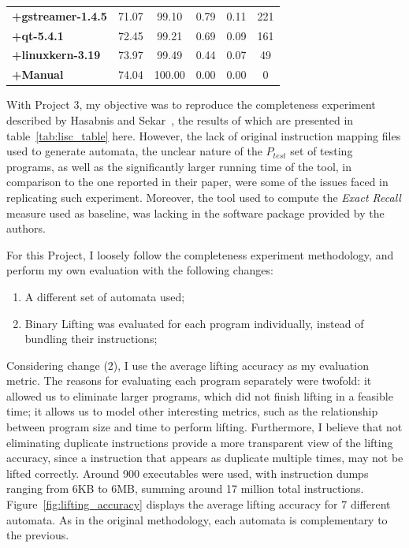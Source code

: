 \documentclass[12pt]{article}
\begin{document}
\begin{table}[ht]
{\begin{tabular}{@{}l|cc|cc|c@{}}
\textbf{+gstreamer-1.4.5}               & 71.07                         & 99.10                & 0.79                       & 0.11                      & 221                                                    \\
\textbf{+qt-5.4.1}                      & 72.45                         & 99.21                & 0.69                       & 0.09                      & 161                                                    \\
\textbf{+linuxkern-3.19}                & 73.97                         & 99.49                & 0.44                       & 0.07                      & 49                                                     \\
\textbf{+Manual}                        & 74.04                         & 100.00               & 0.00                       & 0.00                      & 0                                                      \\ \bottomrule
\end{tabular}%
}
\end{table}

With Project 3, my objective was to reproduce the completeness experiment described by Hasabnis and Sekar~\cite{Hasabnis2014}, the results of which are presented in table~\ref{tab:lisc_table} here. However, the lack of original instruction mapping files used to generate automata, the unclear nature of the $P_{test}$ set of testing programs, as well as the significantly larger running time of the tool, in comparison to the one reported in their paper, were some of the issues faced in replicating such experiment. Moreover, the tool used to compute the \textit{Exact Recall} measure used as baseline, was lacking in the software package provided by the authors. 

For this Project, I loosely follow the completeness experiment methodology, and perform my own evaluation with the following changes:
\begin{enumerate}
\item A different set of automata used;
\item Binary Lifting was evaluated for each program individually, instead of bundling their instructions;
\end{enumerate}
%
Considering change (2), I use the average lifting accuracy as my evaluation metric. The reasons for evaluating each program separately were twofold: it allowed us to eliminate larger programs, which did not finish lifting in a feasible time; it allows us to model other interesting metrics, such as the relationship between program size and time to perform lifting. Furthermore, I believe that not eliminating duplicate instructions provide a more transparent view of the lifting accuracy, since a instruction that appears as duplicate multiple times, may not be lifted correctly. Around 900 executables were used, with instruction dumps ranging from 6KB to 6MB, summing around 17 million total instructions. Figure~\ref{fig:lifting_accuracy} displays the average lifting accuracy for 7 different automata. As in the original methodology, each automata is complementary to the previous.
\end{document}
